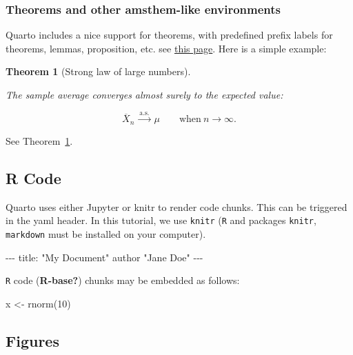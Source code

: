\documentclass[
  11pt,
  a4paper,
]{article}
\newenvironment{Shaded}{}{}
\newcommand{\AttributeTok}[1]{\textcolor[rgb]{0.84,0.23,0.29}{#1}}
\newcommand{\DecValTok}[1]{\textcolor[rgb]{0.00,0.36,0.77}{#1}}
\newcommand{\FunctionTok}[1]{\textcolor[rgb]{0.44,0.26,0.76}{#1}}
\newcommand{\KeywordTok}[1]{\textcolor[rgb]{0.84,0.23,0.29}{#1}}
\newcommand{\NormalTok}[1]{\textcolor[rgb]{0.14,0.16,0.18}{#1}}
\newcommand{\OtherTok}[1]{\textcolor[rgb]{0.44,0.26,0.76}{#1}}
\newcommand{\PreprocessorTok}[1]{\textcolor[rgb]{0.84,0.23,0.29}{#1}}
\newcommand{\StringTok}[1]{\textcolor[rgb]{0.01,0.18,0.38}{#1}}
\theoremstyle{plain}
\newtheorem{theorem}{Theorem}[section]
\theoremstyle{remark}
\begin{document}
\subsubsection{Theorems and other amsthem-like
environments}\label{theorems-and-other-amsthem-like-environments}

Quarto includes a nice support for theorems, with predefined prefix
labels for theorems, lemmas, proposition, etc. see
\href{https://quarto.org/docs/authoring/cross-references.html\#theorems-and-proofs}{this
page}. Here is a simple example:

\begin{theorem}[Strong law of large
numbers]\protect\hypertarget{thm-slln}{}\label{thm-slln}

The sample average converges almost surely to the expected value:

\[\overline{X}_n\ \xrightarrow{\text{a.s.}}\ \mu \qquad\textrm{when}\ n \to \infty.\]

\end{theorem}

See Theorem~\ref{thm-slln}.

\subsection{R Code}\label{r-code}

Quarto uses either Jupyter or knitr to render code chunks. This can be
triggered in the yaml header. In this tutorial, we use \texttt{knitr}
(\texttt{R} and packages \texttt{knitr}, \texttt{markdown} must be
installed on your computer).

\begin{Shaded}
\begin{Highlighting}[]
\PreprocessorTok{{-}{-}{-}}
\FunctionTok{title}\KeywordTok{:}\AttributeTok{ }\StringTok{"My Document"}
\AttributeTok{author "Jane Doe"}
\PreprocessorTok{{-}{-}{-}}
\end{Highlighting}
\end{Shaded}

\texttt{R} code (\textbf{R-base?}) chunks may be embedded as follows:

\begin{Shaded}
\begin{Highlighting}[]
\NormalTok{x }\OtherTok{\textless{}{-}} \FunctionTok{rnorm}\NormalTok{(}\DecValTok{10}\NormalTok{)}
\end{Highlighting}
\end{Shaded}

\subsection{Figures}\label{figures}
\end{document}
